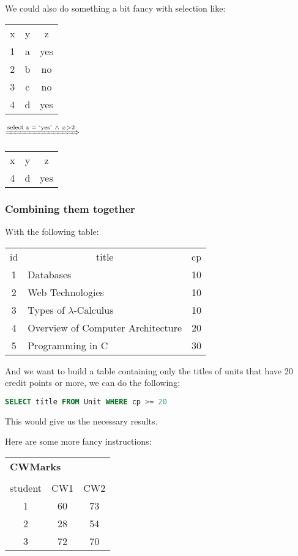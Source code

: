 \documentclass[11pt,a4paper,titlepage,dvipsnames,cmyk]{scrartcl}
\begin{document}
We could also do something a bit fancy with selection like:

\begin{center}
    \begin{tabular}{c|c|c}
        x & y & z \\
        \hhline{=|=|=}
        1 & a & yes \\
        2 & b & no \\
        3 & c & no \\
        4 & d & yes
    \end{tabular}
    \quad \quad $\xRightarrow{\text{select z = `yes'} \ \wedge \ x>2}$
    \quad \quad
    \begin{tabular}{c|c|c}
        x & y & z \\ \hhline{=|=|=}
        4 & d & yes
    \end{tabular}
\end{center}

\subsubsection{Combining them together}%
\label{ssub:combining}
With the following table:

\begin{center}
    \begin{tabular}{c|l|c}
        id & \multicolumn{1}{|c|}{title} & cp \\ \hhline{=|=|=}
        1 & Databases & 10 \\
        2 & Web Technologies & 10 \\
        3 & Types of $\lambda$-Calculus & 10 \\
        4 & Overview of Computer Architecture & 20 \\
        5 & Programming in C & 30 \\
    \end{tabular}
\end{center}

And we want to build a table containing only the titles of units that have
20 credit points or more, we can do the following:

\begin{lstlisting}[language=SQL]
SELECT title FROM Unit WHERE cp >= 20
\end{lstlisting}

This would give us the necessary results.

Here are some more fancy instructions: 

\begin{center}
    \begin{tabular}{c|c|c}
        \multicolumn{3}{l}{\textbf{CWMarks}} \\
        \multicolumn{3}{c}{}
        \\
        student & CW1 & CW2 \\ \hhline{=|=|=}
        1 & 60 & 73 \\
        2 & 28 & 54 \\
        3 & 72 & 70
    \end{tabular}
\end{center}
\end{document}

